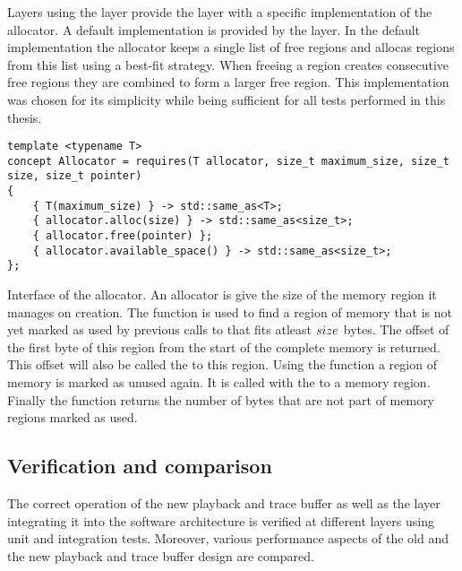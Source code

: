 Layers using the \ayo{} layer provide the \ayo{} layer with a specific implementation of the allocator. A default implementation is provided by the \ayo{} layer. In the default implementation the allocator keeps a single list of free regions and allocas regions from this list using a best-fit strategy. When freeing a region creates consecutive free regions they are combined to form a larger free region. This implementation was chosen for its simplicity while being sufficient for all tests performed in this thesis.
\begin{listing}
\begin{verbatim}
template <typename T>
concept Allocator = requires(T allocator, size_t maximum_size, size_t size, size_t pointer)
{
	{ T(maximum_size) } -> std::same_as<T>;
	{ allocator.alloc(size) } -> std::same_as<size_t>;
	{ allocator.free(pointer) };
	{ allocator.available_space() } -> std::same_as<size_t>;
};
\end{verbatim}
\caption{Interface of the allocator. An allocator is give the size of the memory region it manages on creation. The  function is used to find a region of memory that is not yet marked as used by previous calls to  that fits atleast $\code{size}$ bytes. The offset of the first byte of this region from the start of the complete memory is returned. This offset will also be called the  to this region. Using the  function a region of memory is marked as unused again. It is called with the  to a memory region. Finally the  function returns the number of bytes that are not part of memory regions marked as used.}
\label{listing:allocator_interface}
\end{listing}

\subsection{Verification and comparison}
The correct operation of the new playback and trace buffer as well as the \ayo{} layer integrating it into the \BSSTwo{} software architecture is verified at different layers using unit and integration tests. Moreover, various performance aspects of the old and the new playback and trace buffer design are compared.

